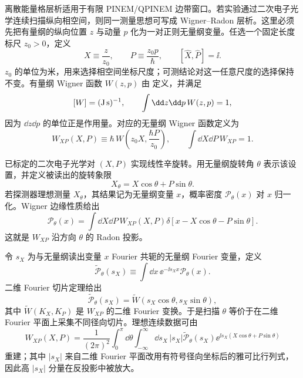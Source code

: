 \begin{exbox}[能量格与纵向相空间层析]
离散能量格层析适用于有限 PINEM/QPINEM 边带窗口。若实验通过二次电子光学连续扫描纵向相空间，则同一测量思想可写成 Wigner--Radon 层析。这里必须先把有量纲的纵向位置 $z$ 与动量 $p$ 化为一对正则无量纲变量。任选一个固定长度标尺 $z_0>0$，定义
\begin{equation}
\boxed{
X\equiv\frac{z}{z_0},
\qquad
P\equiv\frac{z_0p}{\hbar},
\qquad
[\hat X,\hat P]=\ii.}
\label{eq:dimensionless_longitudinal_phase_space}
\end{equation}
$z_0$ 的单位为米，用来选择相空间坐标尺度；可测结论对这一任意尺度的选择保持不变。有量纲 Wigner 函数 $W(z,p)$ 由 定义，并满足
\[
[W]=({\rm J\,s})^{-1},
\qquad
\int\dd z\dd p\,W(z,p)=1,
\]
因为 $\dd z\dd p$ 的单位正是作用量。对应的无量纲 Wigner 函数定义为
\begin{equation*}
W_{XP}(X,P)
\equiv\hbar\,W\!\left(z_0X,\frac{\hbar P}{z_0}\right),
\qquad
\int\dd X\dd P\,W_{XP}=1.
\end{equation*}

已标定的二次电子光学对 $(X,P)$ 实现线性辛旋转。用无量纲旋转角 $\theta$ 表示该设置，并定义被读出的旋转象限
\begin{equation*}
X_\theta=X\cos\theta+P\sin\theta.
\end{equation*}
若探测器理想测量 $X_\theta$，其结果记为无量纲变量 $x$，概率密度 $\mathcal P_\theta(x)$ 对 $x$ 归一化。Wigner 边缘性质给出
\begin{equation}
\boxed{
\mathcal P_\theta(x)
=\int\dd X\dd P\,
W_{XP}(X,P)
\delta[x-X\cos\theta-P\sin\theta].}
\label{eq:wigner_radon_transform}
\end{equation}
这就是 $W_{XP}$ 沿方向 $\theta$ 的 Radon 投影。

令 $s_X$ 为与无量纲读出变量 $x$ Fourier 共轭的无量纲 Fourier 变量，定义
\begin{equation*}
\widetilde{\mathcal P}_\theta(s_X)
\equiv\int\dd x\,\ee^{-\ii s_Xx}\mathcal P_\theta(x).
\end{equation*}
二维 Fourier 切片定理给出
\begin{equation}
\boxed{
\widetilde{\mathcal P}_\theta(s_X)
=\widetilde W(s_X\cos\theta,s_X\sin\theta),}
\label{eq:wigner_fourier_slice_theorem}
\end{equation}
其中 $\widetilde W(K_X,K_P)$ 是 $W_{XP}$ 的二维 Fourier 变换。于是扫描 $\theta$ 等价于在二维 Fourier 平面上采集不同径向切片。理想连续数据可由
\begin{equation}
\boxed{
W_{XP}(X,P)
=\frac{1}{(2\pi)^2}
\int_0^\pi\dd\theta
\int_{-\infty}^{\infty}\dd s_X\,|s_X|
\widetilde{\mathcal P}_\theta(s_X)
\ee^{\ii s_X(X\cos\theta+P\sin\theta)}}
\label{eq:wigner_filtered_backprojection}
\end{equation}
重建；其中 $|s_X|$ 来自二维 Fourier 平面改用有符号径向坐标后的雅可比行列式，因此高 $|s_X|$ 分量在反投影中被放大。


\end{exbox}
